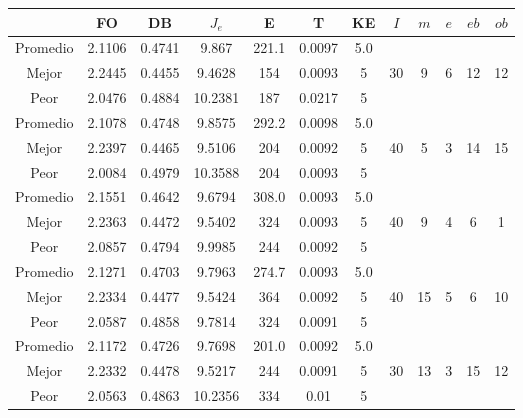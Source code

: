 \begin{table}[h!]
    \footnotesize
    \begin{center}
        \begin{tabular}{|c|c|c|c|c|c|c|c|c|c|c|c|}
        \hline
             & {\bf FO} & {\bf DB} & $J_e$ & {\bf E} & {\bf T} & {\bf KE} & $I$ & $m$ & $e$ & $eb$ & $ob$ \\
        \hline
        \hline
            Promedio  & 2.1106 & 0.4741 & 9.867 & 221.1 & 0.0097 & 5.0 &  &  &  &  & \\
            \cline{1-7}
            Mejor & 2.2445 & 0.4455  & 9.4628 & 154 & 0.0093 & 5 & 30 & 9 & 6 & 12 & 12\\
            \cline{1-7}
            Peor & 2.0476 & 0.4884  & 10.2381 & 187 & 0.0217 & 5 &  &  &  &  & \\
        \hline
        \hline
            Promedio  & 2.1078 & 0.4748 & 9.8575 & 292.2 & 0.0098 & 5.0 &  &  &  &  & \\
            \cline{1-7}
            Mejor & 2.2397 & 0.4465  & 9.5106 & 204 & 0.0092 & 5 & 40 & 5 & 3 & 14 & 15\\
            \cline{1-7}
            Peor & 2.0084 & 0.4979  & 10.3588 & 204 & 0.0093 & 5 &  &  &  &  & \\
        \hline
        \hline
            Promedio  & 2.1551 & 0.4642 & 9.6794 & 308.0 & 0.0093 & 5.0 &  &  &  &  & \\
            \cline{1-7}
            Mejor & 2.2363 & 0.4472  & 9.5402 & 324 & 0.0093 & 5 & 40 & 9 & 4 & 6 & 1\\
            \cline{1-7}
            Peor & 2.0857 & 0.4794  & 9.9985 & 244 & 0.0092 & 5 &  &  &  &  & \\
        \hline
        \hline
            Promedio  & 2.1271 & 0.4703 & 9.7963 & 274.7 & 0.0093 & 5.0 &  &  &  &  & \\
            \cline{1-7}
            Mejor & 2.2334 & 0.4477  & 9.5424 & 364 & 0.0092 & 5 & 40 & 15 & 5 & 6 & 10\\
            \cline{1-7}
            Peor & 2.0587 & 0.4858  & 9.7814 & 324 & 0.0091 & 5 &  &  &  &  & \\
        \hline
        \hline
            Promedio  & 2.1172 & 0.4726 & 9.7698 & 201.0 & 0.0092 & 5.0 &  &  &  &  & \\
            \cline{1-7}
            Mejor & 2.2332 & 0.4478  & 9.5217 & 244 & 0.0091 & 5 & 30 & 13 & 3 & 15 & 12\\
            \cline{1-7}
            Peor & 2.0563 & 0.4863  & 10.2356 & 334 & 0.01 & 5 &  &  &  &  & \\

\end{tabular}
\end{center}
\end{table}
